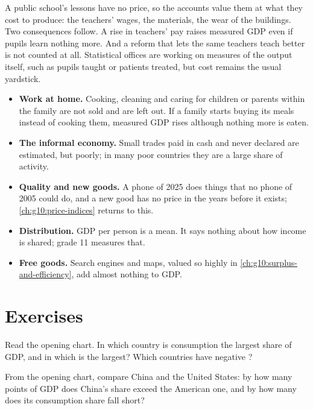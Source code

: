 \begin{measure}
A public school's lessons have no price, so the accounts value them at what they cost to produce: the teachers' wages, the materials, the wear of the buildings.
Two consequences follow. A rise in teachers' pay raises measured GDP even if pupils learn nothing more. And a reform that lets the same teachers teach better is
not counted at all. Statistical offices are working on measures of the output itself, such as pupils taught or patients treated, but cost remains the usual
yardstick.
\end{measure}

\begin{itemize}
\item \textbf{Work at home.} Cooking, cleaning and caring for children or parents within the family are not sold and are left out. If a family starts buying its
  meals instead of cooking them, measured GDP rises although nothing more is eaten.
\item \textbf{The informal economy.} Small trades paid in cash and never declared are estimated, but poorly; in many poor countries they are a large share of
  activity.
\item \textbf{Quality and new goods.} A phone of 2025 does things that no phone of 2005 could do, and a new
  good has no price in the years before it exists; \cref{ch:g10:price-indices} returns to
  this.
\item \textbf{Distribution.} GDP per person is a mean. It says nothing about how income is shared; grade 11 measures that.
\item \textbf{Free goods.} Search engines and maps, valued so highly in \cref{ch:g10:surplus-and-efficiency}, add almost nothing to GDP.
\end{itemize}

\section{Exercises}

\begin{exercise}[$\star$]\label{exo:g10:national-accounts:1}
Read the opening chart. In which country is consumption the largest share of GDP, and in which is  the largest? Which countries have negative ?
\end{exercise}

\begin{exercise}[$\star$]\label{exo:g10:national-accounts:2}
From the opening chart, compare China and the United States: by how many points of GDP does China's  share exceed the American one, and by how many does
its consumption share fall short?
\end{exercise}

